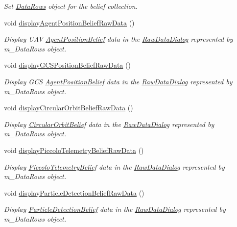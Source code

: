 \begin{DoxyCompactItemize}
\begin{DoxyCompactList}\small\item\em Set \hyperlink{struct_data_rows}{DataRows} object for the belief collection. \end{DoxyCompactList}\item 
void \hyperlink{class_belief_collection_a702d3d6d5ecf17712b45b57d6fe14a60}{displayAgentPositionBeliefRawData} ()
\begin{DoxyCompactList}\small\item\em Display UAV \hyperlink{class_agent_position_belief}{AgentPositionBelief} data in the \hyperlink{class_raw_data_dialog}{RawDataDialog} represented by m\_\-DataRows object. \end{DoxyCompactList}\item 
void \hyperlink{class_belief_collection_a14b41ac0a8636586e573659915a24f14}{displayGCSPositionBeliefRawData} ()
\begin{DoxyCompactList}\small\item\em Display GCS \hyperlink{class_agent_position_belief}{AgentPositionBelief} data in the \hyperlink{class_raw_data_dialog}{RawDataDialog} represented by m\_\-DataRows object. \end{DoxyCompactList}\item 
void \hyperlink{class_belief_collection_a8d8325ef7a988883be00040cab1f34ff}{displayCircularOrbitBeliefRawData} ()
\begin{DoxyCompactList}\small\item\em Display \hyperlink{class_circular_orbit_belief}{CircularOrbitBelief} data in the \hyperlink{class_raw_data_dialog}{RawDataDialog} represented by m\_\-DataRows object. \end{DoxyCompactList}\item 
void \hyperlink{class_belief_collection_a370765050c596aa8c7eab1930b93f904}{displayPiccoloTelemetryBeliefRawData} ()
\begin{DoxyCompactList}\small\item\em Display \hyperlink{class_piccolo_telemetry_belief}{PiccoloTelemetryBelief} data in the \hyperlink{class_raw_data_dialog}{RawDataDialog} represented by m\_\-DataRows object. \end{DoxyCompactList}\item 
void \hyperlink{class_belief_collection_a9a4e94a10f524006fe1157e5681145d0}{displayParticleDetectionBeliefRawData} ()
\begin{DoxyCompactList}\small\item\em Display \hyperlink{class_particle_detection_belief}{ParticleDetectionBelief} data in the \hyperlink{class_raw_data_dialog}{RawDataDialog} represented by m\_\-DataRows object. \end{DoxyCompactList}\item 

\end{DoxyCompactItemize}
